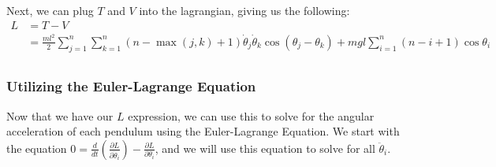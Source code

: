 \documentclass{article}
\begin{document}
Next, we can plug $T$ and $V$ into the lagrangian, giving us the following:
\begin{align*}
	L &= T-V \\
	&=  \frac{ml^2}{2} \sum_{j=1}^n\sum_{k=1}^n(n-\max(j,k)+1)\dot\theta_j\dot\theta_k\cos(\theta_j-\theta_k) + mgl\sum_{i=1}^n (n-i+1)\cos\theta_i\\
\end{align*}
\subsubsection{Utilizing the Euler-Lagrange Equation}
Now that we have our $L$ expression, we can use this to solve for the angular acceleration of each pendulum using the Euler-Lagrange Equation. We start with the equation $0 = \frac{d}{dt}\left(\frac{\partial L}{\partial \dot \theta_i}\right) - \frac{\partial L}{\partial \theta_i}$, and we will use this equation to solve for all $\ddot\theta_i.$
\end{document}

